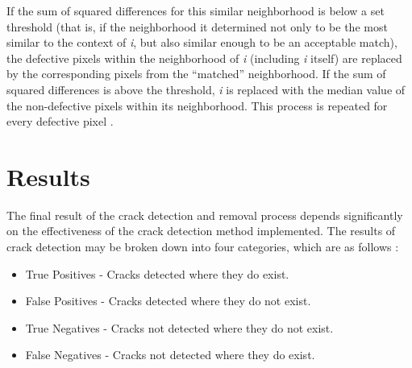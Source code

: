 \documentclass{sig-alternate}
\begin{document}
If the sum of squared differences for this similar neighborhood is below a set threshold (that is, if the neighborhood it determined not only to be the most similar to the context of \textit{i}, but also similar enough to be an acceptable match), the defective pixels within the neighborhood of \textit{i} (including \textit{i} itself) are replaced by the corresponding pixels from the ``matched'' neighborhood. If the sum of squared differences is above the threshold, \textit{i} is replaced with the median value of the non-defective pixels within its neighborhood. This process is repeated for every defective pixel \cite{TopHat:2010}.

\section{Results}\label{results}
The final result of the crack detection and removal process depends significantly on the effectiveness of the crack detection method implemented. The results of crack detection may be broken down into four categories, which are as follows \cite{Statistics:2013}:
\begin{itemize}
\item True Positives - Cracks detected where they do exist.
\item False Positives - Cracks detected where they do not exist.
\item True Negatives - Cracks not detected where they do not exist.
\item False Negatives - Cracks not detected where they do exist.
\end{itemize}
\end{document}
